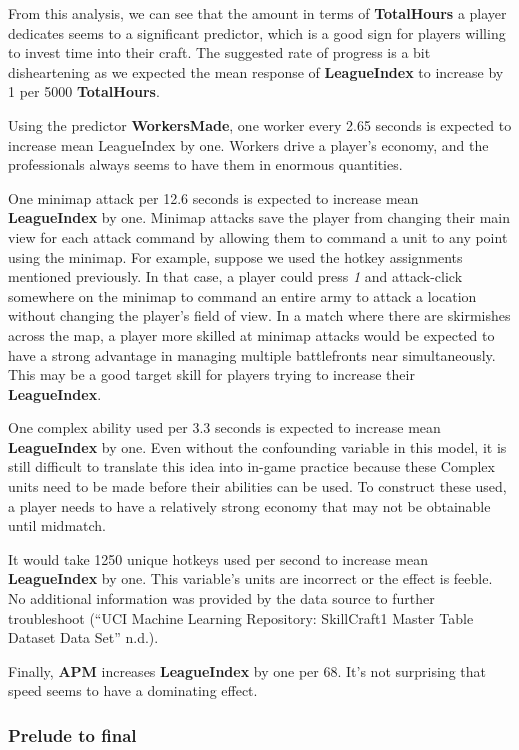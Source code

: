 \documentclass[]{article}
\begin{document}
From this analysis, we can see that the amount in terms of
\textbf{TotalHours} a player dedicates seems to a significant predictor,
which is a good sign for players willing to invest time into their
craft. The suggested rate of progress is a bit disheartening as we
expected the mean response of \textbf{LeagueIndex} to increase by 1 per
5000 \textbf{TotalHours}.

Using the predictor \textbf{WorkersMade}, one worker every 2.65 seconds
is expected to increase mean LeagueIndex by one. Workers drive a
player's economy, and the professionals always seems to have them in
enormous quantities.

One minimap attack per 12.6 seconds is expected to increase mean
\textbf{LeagueIndex} by one. Minimap attacks save the player from
changing their main view for each attack command by allowing them to
command a unit to any point using the minimap. For example, suppose we
used the hotkey assignments mentioned previously. In that case, a player
could press \emph{1} and attack-click somewhere on the minimap to
command an entire army to attack a location without changing the
player's field of view. In a match where there are skirmishes across the
map, a player more skilled at minimap attacks would be expected to have
a strong advantage in managing multiple battlefronts near
simultaneously. This may be a good target skill for players trying to
increase their \textbf{LeagueIndex}.

One complex ability used per 3.3 seconds is expected to increase mean
\textbf{LeagueIndex} by one. Even without the confounding variable in
this model, it is still difficult to translate this idea into in-game
practice because these Complex units need to be made before their
abilities can be used. To construct these used, a player needs to have a
relatively strong economy that may not be obtainable until midmatch.

It would take 1250 unique hotkeys used per second to increase mean
\textbf{LeagueIndex} by one. This variable's units are incorrect or the
effect is feeble. No additional information was provided by the data
source to further troubleshoot (``UCI Machine Learning Repository:
SkillCraft1 Master Table Dataset Data Set'' n.d.).

Finally, \textbf{APM} increases \textbf{LeagueIndex} by one per 68. It's
not surprising that speed seems to have a dominating effect.

\hypertarget{prelude-to-final}{%
\subsubsection{Prelude to final}\label{prelude-to-final}}
\end{document}
